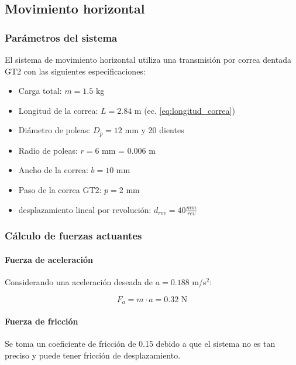 \subsection{Movimiento horizontal}

\subsubsection{Parámetros del sistema}

El sistema de movimiento horizontal utiliza una transmisión por correa dentada GT2 con las siguientes especificaciones:

\begin{itemize}
    \item Carga total: $m = 1.5$ kg
    \item Longitud de la correa: $L = 2.84$ m (ec. \ref{eq:longitud_correa})
    \item Diámetro de poleas: $D_p = 12$ mm y 20 dientes
    \item Radio de poleas: $r = 6$ mm = $0.006$ m
    \item Ancho de la correa: $b = 10$ mm
    \item Paso de la correa GT2: $p = 2$ mm
    \item desplazamiento lineal por revolución: $d_{rev} = 40 \frac{mm}{rev}$
\end{itemize}

\subsubsection{Cálculo de fuerzas actuantes}

\paragraph{Fuerza de aceleración}

Considerando una aceleración deseada de $a = 0.188$ m/s$^2$:

\begin{equation}
    F_a = m \cdot a = 0.32 \text{ N}
\end{equation}

\paragraph{Fuerza de fricción}

Se toma un coeficiente de fricción de 0.15 debido a que el sistema no es tan preciso y puede tener fricción de desplazamiento.


